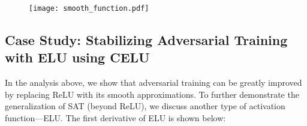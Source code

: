 \documentclass{article}
\begin{document}
\begin{figure}[t!]
\begin{minipage}{\linewidth}
  \begin{minipage}[b]{0.7\linewidth}
    \centering
    \texttt{[image: smooth\_function.pdf]}
    \label{fig:smooth_function}
  \end{minipage}
  \hfill
  \begin{minipage}[b]{0.22\linewidth}
    \centering
    \label{tab:elu_celu}
  \end{minipage}
\end{minipage}
\vspace{-1em}
\end{figure}


\subsection{Case Study: Stabilizing Adversarial Training with ELU using CELU}
\label{sec:non-smooth ELU}
In the analysis above, we show that adversarial training can be greatly improved by replacing ReLU with its smooth approximations. To further demonstrate the generalization of SAT (beyond ReLU), we discuss another type of activation function---ELU. The first derivative of ELU is shown below:
\end{document}
